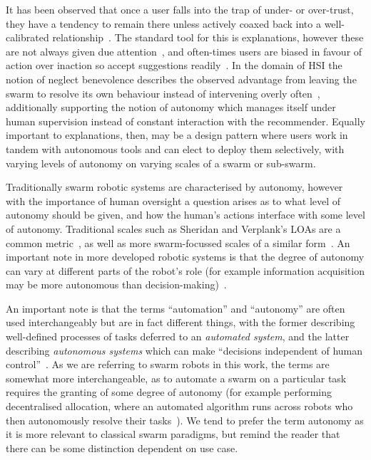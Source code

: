 \documentclass[10pt]{article}
\theoremstyle{definition}
\begin{document}
It has been observed that once a user falls into the trap of under- or over-trust, they have a tendency to remain there unless actively coaxed back into a well-calibrated relationship~\cite{okamura_adaptive_2020}. The standard tool for this is explanations, however these are not always given due attention~\cite{naiseh_explainable_2021, wagner_explanation_2021}, and often-times users are biased in favour of action over inaction so accept suggestions readily~\cite{mosier_automation_1999}. In the domain of HSI the notion of neglect benevolence describes the observed advantage from leaving the swarm to resolve its own behaviour instead of intervening overly often~\cite{nagavalli2014neglect}, additionally supporting the notion of autonomy which manages itself under human supervision instead of constant interaction with the recommender. Equally important to explanations, then, may be a design pattern where users work in tandem with autonomous tools and can elect to deploy them selectively, with varying levels of autonomy on varying scales of a swarm or sub-swarm.

Traditionally swarm robotic systems are characterised by autonomy, however with the importance of human oversight a question arises as to what level of autonomy should be given, and how the human's actions interface with some level of autonomy. Traditional scales such as Sheridan and Verplank's LOAs are a common metric~\cite{sheridan1978human}, as well as more swarm-focussed scales of a similar form~\cite{hocraffer_meta-analysis_2017}. An important note in more developed robotic systems is that the degree of autonomy can vary at different parts of the robot's role (for example information acquisition may be more autonomous than decision-making)~\cite{onnasch_taxonomy_2021}.

An important note is that the terms ``automation'' and ``autonomy'' are often used interchangeably but are in fact different things, with the former describing well-defined processes of tasks deferred to an \textit{automated system}, and the latter describing \textit{autonomous systems} which can make ``decisions independent of human control''~\cite{lyons_humanautonomy_2021}. As we are referring to swarm robots in this work, the terms are somewhat more interchangeable, as to automate a swarm on a particular task requires the granting of some degree of autonomy (for example performing decentralised allocation, where an automated algorithm runs across robots who then autonomously resolve their tasks~\cite{delle2012methodology}). We tend to prefer the term autonomy as it is more relevant to classical swarm paradigms, but remind the reader that there can be some distinction dependent on use case.
\end{document}
